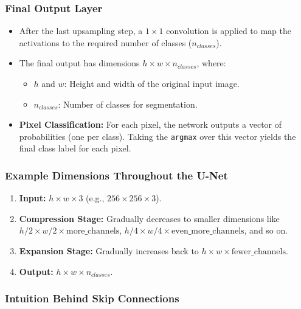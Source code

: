 \documentclass[letterpaper,12pt,notitlepage,twoside]{report}
\begin{document}
\subsubsection*{Final Output Layer}

\begin{itemize}
    \item After the last upsampling step, a \( 1 \times 1 \) convolution is applied to map the activations to the required number of classes ($n_{classes}$).
    \item The final output has dimensions \( h \times w \times n_{classes} \), where:
    \begin{itemize}
        \item \( h \) and \( w \): Height and width of the original input image.
        \item $n_{classes}$: Number of classes for segmentation.
    \end{itemize}
    \item \textbf{Pixel Classification:} For each pixel, the network outputs a vector of probabilities (one per class). Taking the \texttt{argmax} over this vector yields the final class label for each pixel.
\end{itemize}

\subsubsection*{Example Dimensions Throughout the U-Net}

\begin{enumerate}
    \item \textbf{Input:} \( h \times w \times 3 \) (e.g., \( 256 \times 256 \times 3 \)).
    \item \textbf{Compression Stage:} Gradually decreases to smaller dimensions like \( h/2 \times w/2 \times \text{more\_channels} \), \( h/4 \times w/4 \times \text{even\_more\_channels} \), and so on.
    \item \textbf{Expansion Stage:} Gradually increases back to \( h \times w \times \text{fewer\_channels} \).
    \item \textbf{Output:} \( h \times w \times n_{classes} \).
\end{enumerate}

\subsubsection*{Intuition Behind Skip Connections}
\end{document}
